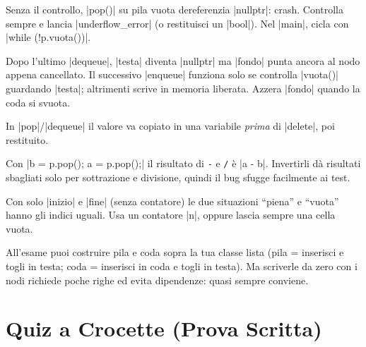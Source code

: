 \begin{trappola}
Senza il controllo, \cc|pop()| su pila vuota dereferenzia \cc|nullptr|: crash. Controlla
sempre e lancia \cc|underflow_error| (o restituisci un \cc|bool|). Nel \cc|main|, cicla
con \cc|while (!p.vuota())|.
\end{trappola}

\begin{trappola}
Dopo l'ultimo \cc|dequeue|, \cc|testa| diventa \cc|nullptr| ma \cc|fondo| punta ancora
al nodo appena cancellato. Il successivo \cc|enqueue| funziona solo se controlla
\cc|vuota()| guardando \cc|testa|; altrimenti scrive in memoria liberata. Azzera
\cc|fondo| quando la coda si svuota.
\end{trappola}

\begin{trappola}
In \cc|pop|/\cc|dequeue| il valore va copiato in una variabile \emph{prima} di
\cc|delete|, poi restituito.
\end{trappola}

\begin{trappola}
Con \cc|b = p.pop(); a = p.pop();| il risultato di \texttt{-} e \texttt{/} è \cc|a - b|.
Invertirli dà risultati sbagliati solo per sottrazione e divisione, quindi il bug sfugge
facilmente ai test.
\end{trappola}

\begin{trappola}
Con solo \cc|inizio| e \cc|fine| (senza contatore) le due situazioni ``piena'' e
``vuota'' hanno gli indici uguali. Usa un contatore \cc|n|, oppure lascia sempre una cella
vuota.
\end{trappola}

\begin{consiglio}
All'esame puoi costruire pila e coda sopra la tua classe lista (pila = inserisci e togli
in testa; coda = inserisci in coda e togli in testa). Ma scriverle da zero con i nodi
richiede poche righe ed evita dipendenze: quasi sempre conviene.
\end{consiglio}

\section{Quiz a Crocette (Prova Scritta)}

